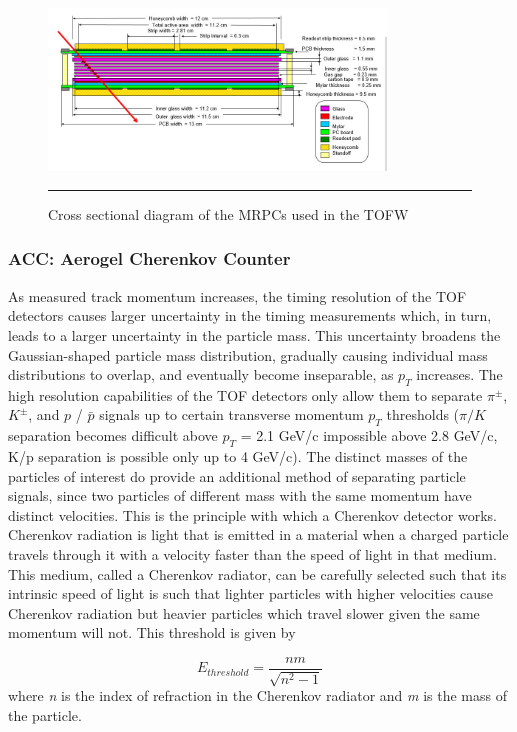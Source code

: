 \begin{figure}[ht!]
  \centering
    \includegraphics[width=0.8\textwidth]{Figures/MRPC_TOFW.jpg}
    \rule{35em}{0.5pt}
  \caption[Cross sectional diagram of the MRPCs used in the TOFW]{Cross sectional diagram of the MRPCs used in the TOFW}
  \label{fig:MRPCTOFW}
\end{figure}

\subsubsection{ACC: Aerogel Cherenkov Counter}
As measured track momentum increases, the timing resolution of the TOF detectors causes larger uncertainty in the timing measurements which, in turn, leads to a larger uncertainty in the particle mass. This uncertainty broadens the Gaussian-shaped particle mass distribution, gradually causing individual mass distributions to overlap, and eventually become inseparable, as $p_T$ increases. The high resolution capabilities of the TOF detectors only allow them to separate $\pi^{\pm}$, $K^{\pm}$, and $p$ / $\bar{p}$ signals up to certain transverse momentum $p_{T}$ thresholds ($\pi/K$ separation becomes difficult above $p_T$ = 2.1 GeV/c impossible above 2.8 GeV/c, K/p separation is possible only up to 4 GeV/c). The distinct masses of the particles of interest do provide an additional method of separating particle signals, since two particles of different mass with the same momentum have distinct velocities. This is the principle with which a Cherenkov detector works. Cherenkov radiation is light that is emitted in a material when a charged particle travels through it with a velocity faster than the speed of light in that medium. This medium, called a Cherenkov radiator, can be carefully selected such that its intrinsic speed of light is such that lighter particles with higher velocities cause Cherenkov radiation but heavier particles which travel slower given the same momentum will not. This threshold is given by

\begin{equation}
E_{threshold} = \frac{nm}{\sqrt{n^2-1}}
\end{equation}
where \textit{n} is the index of refraction in the Cherenkov radiator and \textit{m} is the mass of the particle.


